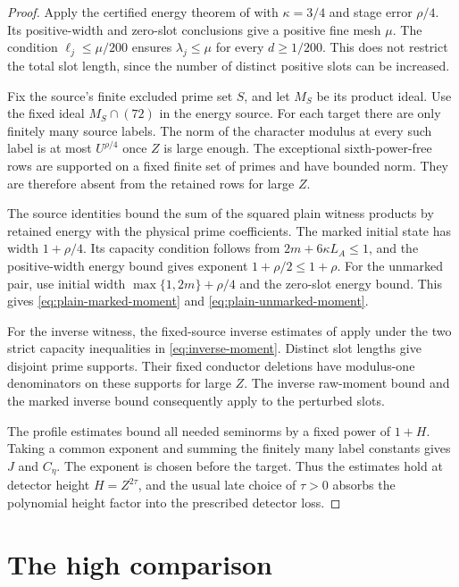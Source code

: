 \documentclass[11pt]{article}
\begin{document}
\begin{proof}
Apply the certified energy theorem of \cite{OAI} with $\kappa=3/4$ and
stage error $\rho/4$. Its positive-width and zero-slot conclusions give a
positive fine mesh $\mu$. The condition $\ell_j\le\mu/200$ ensures
$\lambda_j\le\mu$ for every $d\ge1/200$. This does not restrict the total
slot length, since the number of distinct positive slots can be increased.

Fix the source's finite excluded prime set $S$, and let $M_S$ be its
product ideal. Use the fixed ideal $M_S\cap(72)$ in the energy source.
For each target there are only finitely many source labels. The norm of
the character modulus at every such label is at most $U^{\rho/4}$ once $Z$ is large
enough. The exceptional sixth-power-free rows are supported on a fixed
finite set of primes and have bounded norm. They are therefore absent
from the retained rows for large $Z$.

The source identities bound the sum of the squared plain witness products
by retained energy with the physical prime coefficients. The marked initial state
has width $1+\rho/4$. Its capacity condition follows from
$2m+6\kappa L_A\le1$, and the positive-width energy bound gives exponent
$1+\rho/2\le1+\rho$. For the unmarked pair, use initial width
$\max\{1,2m\}+\rho/4$ and the zero-slot energy bound. This gives
\eqref{eq:plain-marked-moment} and \eqref{eq:plain-unmarked-moment}.

For the inverse witness, the fixed-source inverse estimates of \cite{OAI}
apply under the two strict capacity inequalities in
\eqref{eq:inverse-moment}. Distinct slot lengths give disjoint prime
supports. Their fixed conductor deletions have modulus-one denominators
on these supports for large $Z$. The inverse raw-moment bound and the
marked inverse bound consequently apply to the perturbed slots.

The profile estimates bound all needed seminorms by a fixed power of
$1+H$. Taking a common exponent and summing the finitely many label
constants gives $J$ and $C_\eta$. The exponent is chosen before the
target. Thus the estimates hold at detector height $H=Z^{2\tau}$, and
the usual late choice of $\tau>0$ absorbs the polynomial height factor
into the prescribed detector loss.
\end{proof}

\section{The high comparison}\label{sec:high}
\end{document}
